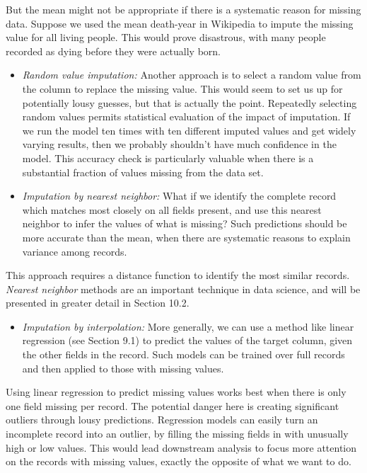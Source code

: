 \documentclass[10pt]{article}
\begin{document}
But the mean might not be appropriate if there is a systematic reason for missing data. Suppose we used the mean death-year in Wikipedia to impute the missing value for all living people. This would prove disastrous, with many people recorded as dying before they were actually born.

\begin{itemize}
    \item \textit{Random value imputation:} Another approach is to select a random value from the column to replace the missing value. This would seem to set us up for potentially lousy guesses, but that is actually the point. Repeatedly selecting random values permits statistical evaluation of the impact of imputation. If we run the model ten times with ten different imputed values and get widely varying results, then we probably shouldn't have much confidence in the model. This accuracy check is particularly valuable when there is a substantial fraction of values missing from the data set.
    \item \textit{Imputation by nearest neighbor:} What if we identify the complete record which matches most closely on all fields present, and use this nearest neighbor to infer the values of what is missing? Such predictions should be more accurate than the mean, when there are systematic reasons to explain variance among records.
\end{itemize}

This approach requires a distance function to identify the most similar records. \textit{Nearest neighbor} methods are an important technique in data science, and will be presented in greater detail in Section 10.2.

\begin{itemize}
    \item \textit{Imputation by interpolation:} More generally, we can use a method like linear regression (see Section 9.1) to predict the values of the target column, given the other fields in the record. Such models can be trained over full records and then applied to those with missing values.
\end{itemize}

Using linear regression to predict missing values works best when there is only one field missing per record. The potential danger here is creating significant outliers through lousy predictions. Regression models can easily turn an incomplete record into an outlier, by filling the missing fields in with unusually high or low values. This would lead downstream analysis to focus more attention on the records with missing values, exactly the opposite of what we want to do.
\end{document}
